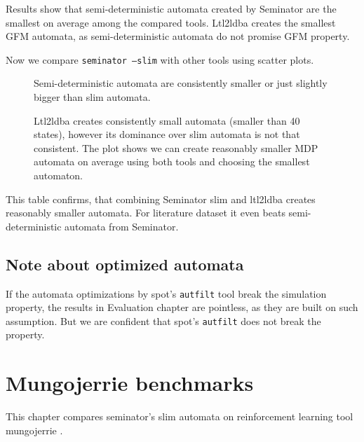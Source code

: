 \documentclass[
	digital
nolof, nolot
]{fithesis3}
\begin{document}
		\begin{table}[ht]
			\centering
			\caption{Results show that semi-deterministic automata created by Seminator are the smallest on average among the compared tools. Ltl2ldba creates the smallest GFM automata, as semi-deterministic automata do not promise GFM property. }
			
		\end{table}
		
		
		
		Now we compare \texttt{seminator --slim} with other tools using scatter plots.
		\begin{figure}[ht]
			\centering
			\caption{Semi-deterministic automata are consistently smaller or just slightly bigger than slim automata.}
			\begin{tikzpicture}
				
			\end{tikzpicture}
		\end{figure}
		
		
		\begin{figure}[ht]
			\centering
			\caption{Ltl2ldba creates consistently small automata (smaller than 40 states), however its dominance over slim automata is not that consistent. The plot shows we can create reasonably smaller MDP automata on average using both tools and choosing the smallest automaton. }
		\begin{tikzpicture}
		
		\end{tikzpicture}
		\end{figure}
	
	\begin{table}[ht]
		\centering
		\caption{This table confirms, that combining Seminator slim and ltl2ldba creates reasonably smaller automata. For literature dataset it even beats semi-deterministic automata from Seminator.}
		
	\end{table}

		\clearpage
		\section{Note about optimized automata}
		If the automata optimizations by spot's 
		\texttt{autfilt} tool break the simulation property, the results in Evaluation chapter are pointless, as they are built on such assumption. But we are confident that spot's \texttt{autfilt} does not break the property.
	\chapter{Mungojerrie benchmarks}
	This chapter compares seminator's slim automata on reinforcement learning tool mungojerrie \cite{mungojerrie}.
	
\end{document}
